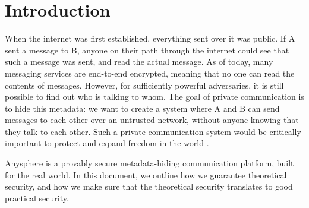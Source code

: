 \section{Introduction}

When the internet was first established, everything sent over it was public. If A sent a message to B, anyone on their path through the internet could see that such a message was sent, and read the actual message. As of today, many messaging services are end-to-end encrypted, meaning that no one can read the contents of messages. However, for sufficiently powerful adversaries, it is still possible to find out who is talking to whom. The goal of private communication is to hide this metadata: we want to create a system where A and B can send messages to each other over an untrusted network, without anyone knowing that they talk to each other. Such a private communication system would be critically important to protect and expand freedom in the world \cite{arvid}.

Anysphere is a provably secure metadata-hiding communication platform, built for the real world. In this document, we outline how we guarantee theoretical security, and how we make sure that the theoretical security translates to good practical security.
